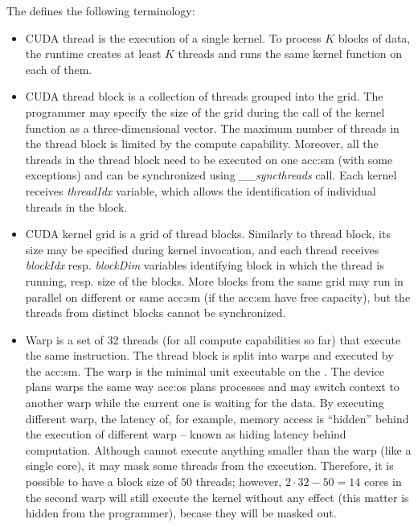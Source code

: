 The \cuda defines the following terminology:
\begin{itemize}
    \item CUDA thread is the execution of a single kernel. To process $K$ blocks of data, the runtime creates at least $K$ threads and runs the same kernel function on each of them.
    \item CUDA thread block is a collection of threads grouped into the grid. The programmer may specify the size of the grid during the call of the kernel function as a three-dimensional vector. The maximum number of threads in the thread block is limited by the compute capability. Moreover, all the threads in the thread block need to be executed on one \acrshort{acc:sm} (with some exceptions) and can be synchronized using \textit{\_\_syncthreads} call. Each kernel receives \textit{threadIdx} variable, which allows the identification of individual threads in the block.
    \item CUDA kernel grid is a grid of thread blocks. Similarly to thread block, its size may be specified during kernel invocation, and each thread receives \textit{blockIdx} resp. \textit{blockDim} variables identifying block in which the thread is running, resp. size of the blocks. More blocks from the same grid may run in parallel on different or same \acrshort{acc:sm} (if the \acrshort{acc:sm} have free capacity), but the threads from distinct blocks cannot be synchronized.
    \item Warp is a set of 32 threads (for all compute capabilities so far) that execute the same instruction. The thread block is split into warps and executed by the \acrshort{acc:sm}. The warp is the minimal unit executable on the \gpu. The device plans warps the same way \acrshort{acc:os} plans processes and may switch context to another warp while the current one is waiting for the data. By executing different warp, the latency of, for example, memory access is \enquote{hidden} behind the execution of different warp -- known as hiding latency behind computation. Although \gpu cannot execute anything smaller than the warp (like a single core), it may mask some threads from the execution. Therefore, it is possible to have a block size of $50$ threads; however, $2\cdot32 - 50=14$ cores in the second warp will still execute the kernel without any effect (this matter is hidden from the programmer), becase they will be masked out.
\end{itemize}

